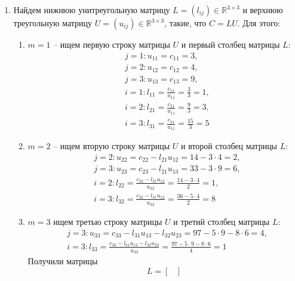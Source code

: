 \documentclass[a4paper, 12pt]{article}
\begin{document}
	\begin{enumerate}
		\item Найдем нижнюю унитреугольную матрицу $L=(l_{ij})\in\mathbb{R}^{3\times3}$ и верхнюю треугольную матрицу $U=(u_{ij})\in\mathbb{R}^{3\times3}$, такие, что $C=LU$. Для этого:
		\begin{enumerate}
			\item $m=1$ -- ищем первую строку матрицы $U$ и первый столбец матрицы $L$:
			\begin{equation*}
				\begin{aligned}
				&j=1:u_{11}=c_{11}=3,\\
				&j=2:u_{12}=c_{12}=4,\\
				&j=3:u_{13}=c_{13}=9,\\
				&i=1:l_{11}=\frac{c_{11}}{u_{11}}=\frac{3}{3}=1,\\
				&i=2:l_{21}=\frac{c_{21}}{u_{11}}=\frac{9}{3}=3,\\
				&i=3:l_{31}=\frac{c_{31}}{u_{11}}=\frac{15}{3}=5
				\end{aligned}
			\end{equation*}
			\item $m=2$ -- ищем вторую строку матрицы $U$ и второй столбец матрицы $L$:
			\begin{equation*}
				\begin{aligned}
					&j=2:u_{22}=c_{22}-l_{21}u_{12}=14-3\cdot 4=2,\\
					&j=3:u_{23}=c_{23}-l_{21}u_{13}=33-3\cdot 9=6,\\
					&i=2:l_{22}=\frac{c_{22}-l_{21}u_{12}}{u_{22}}=\frac{14-3\cdot 4}{2}=1,\\
					&i=3:l_{32}=\frac{c_{32}-l_{31}u_{12}}{u_{22}}=\frac{36-5\cdot 4}{2}=8
				\end{aligned}
			\end{equation*}
			\item $m=3$ ищем третью строку матрицы $U$ и третий столбец матрицы $L$: 
			\begin{equation*}
				\begin{aligned}
					&j=3:u_{33}=c_{33}-l_{31}u_{13}-l_{32}u_{23}=97-5\cdot 9-8\cdot 6=4,\\
					&i=3:l_{33}=\frac{c_{33}-l_{31}u_{13}-l_{32}u_{23}}{u_{33}}=\frac{97-5\cdot 9-8\cdot 6}{4}=1
				\end{aligned}
			\end{equation*}
			Получили матрицы
			\begin{equation*}
				L=
				\begin{bmatrix}

\end{bmatrix}
\end{equation*}
\end{enumerate}
\end{enumerate}
\end{document}
